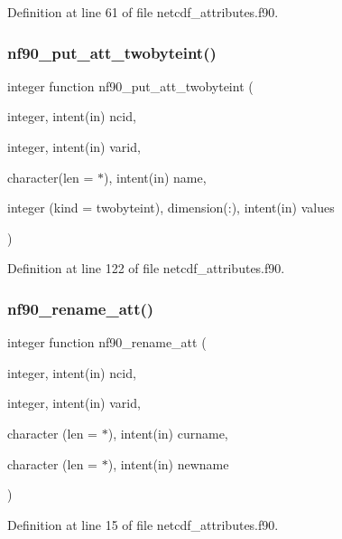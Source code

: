 Definition at line 61 of file netcdf\+\_\+attributes.\+f90.

\mbox{\label{netcdf__attributes_8f90_a784122c3e1ef96565740ef2f337aef63}} 
\subsubsection{\texorpdfstring{nf90\+\_\+put\+\_\+att\+\_\+twobyteint()}{nf90\_put\_att\_twobyteint()}}
{\footnotesize\ttfamily integer function nf90\+\_\+put\+\_\+att\+\_\+twobyteint (\begin{DoxyParamCaption}\item[{integer, intent(in)}]{ncid,  }\item[{integer, intent(in)}]{varid,  }\item[{character(len = $\ast$), intent(in)}]{name,  }\item[{integer (kind = twobyteint), dimension(\+:), intent(in)}]{values }\end{DoxyParamCaption})}



Definition at line 122 of file netcdf\+\_\+attributes.\+f90.

\mbox{\label{netcdf__attributes_8f90_ad51adff25be3d5ed90fd323c3fbcab5c}} 
\subsubsection{\texorpdfstring{nf90\+\_\+rename\+\_\+att()}{nf90\_rename\_att()}}
{\footnotesize\ttfamily integer function nf90\+\_\+rename\+\_\+att (\begin{DoxyParamCaption}\item[{integer, intent(in)}]{ncid,  }\item[{integer, intent(in)}]{varid,  }\item[{character (len = $\ast$), intent(in)}]{curname,  }\item[{character (len = $\ast$), intent(in)}]{newname }\end{DoxyParamCaption})}



Definition at line 15 of file netcdf\+\_\+attributes.\+f90.

